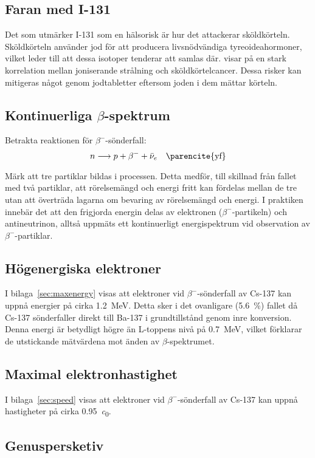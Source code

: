 \subsection{Faran med I-131}

Det som utmärker I-131 som en hälsorisk är hur det attackerar sköldkörteln.
Sköldkörteln använder jod för att producera livsnödvändiga tyreoideahormoner,
vilket leder till att dessa isotoper tenderar att samlas där. \textcite{iodine}
visar på en stark korrelation mellan joniserande strålning och
sköldkörtelcancer. Dessa risker kan mitigeras något genom jodtabletter eftersom
joden i dem mättar körteln.

\subsection{Kontinuerliga $\beta$-spektrum}

Betrakta reaktionen för $\beta^-$-sönderfall:
%
\begin{equation}
    n \longrightarrow p + \beta^- + \bar{\nu}_e \quad \text{\parencite{yf}}
\end{equation}

Märk att tre partiklar bildas i processen. Detta medför, till skillnad från
fallet med två partiklar, att rörelsemängd och energi fritt kan fördelas
mellan de tre utan att överträda lagarna om bevaring av rörelsemängd och
energi. I praktiken innebär det att den frigjorda energin delas av elektronen
($\beta^-$-partikeln) och antineutrinon, alltså uppmäts ett kontinuerligt
energispektrum vid observation av $\beta^-$-partiklar.

\subsection{Högenergiska elektroner}

I bilaga~\ref{sec:maxenergy} visas att elektroner vid $\beta^-$-sönderfall av
Cs-137 kan uppnå energier på cirka \qty{1.2}{\MeV}. Detta sker i det ovanligare
(\qty{5.6}{\percent}) fallet då Cs-137 sönderfaller direkt till Ba-137 i
grundtillstånd genom inre konversion. Denna energi är betydligt högre än
L-toppens nivå på \qty{0.7}{\MeV}, vilket förklarar de utstickande mätvärdena
mot änden av $\beta$-spektrumet.

\subsection{Maximal elektronhastighet}

I bilaga~\ref{sec:speed} visas att elektroner vid $\beta^-$-sönderfall av
Cs-137 kan uppnå hastigheter på cirka \qty{0.95}{\clight}.

\subsection{Genuspersketiv}
